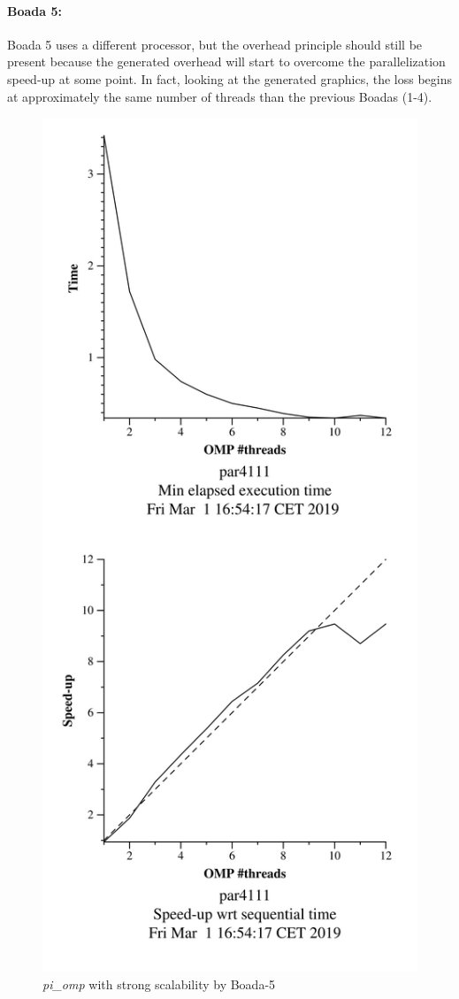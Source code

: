 \documentclass[12]{article}
\begin{document}
\bigskip
\paragraph{Boada 5:}
Boada 5 uses a different processor, but the overhead principle should still be present because the generated overhead will start to overcome the parallelization speed-up at some point. In fact, looking at the generated graphics, the loss begins at approximately the same number of threads than the previous Boadas (1-4).  
\begin{figure}[H]
\centering
\includegraphics[scale=0.15]{images/pi_omp-1000000000-1-12-3-strong-boada-5.png}
 \caption{ \textit{pi\_omp} with strong scalability by Boada-5}
  \label{fig:pi_strong_ompboada5}
\end{figure}
\end{document}

